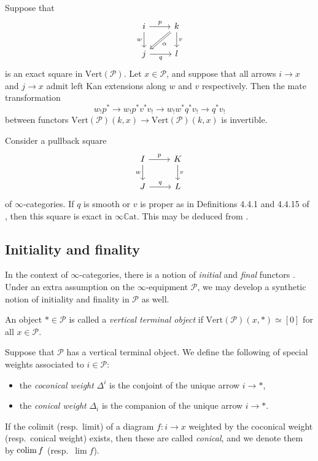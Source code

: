 \documentclass[a4paper, 11pt]{amsart}
\numberwithin{theorem}{section}
\theoremstyle{definition}
\def\colim{\qopname\relax m{colim}}
\renewcommand{\P}{\mathscr{P}}
\renewcommand{\Vert}{\mathrm{Vert}}
\newcommand{\CCAT}{\mathbb{C}\mathrm{at}}
\begin{document}
\begin{corollary}\label{cor.exact-square-mate}
	Suppose that
	\[
		\begin{tikzcd}
			i \arrow[r, "p"]\arrow[d,"w"'] &|[alias=f]| k \arrow[d, "v"] \\ 
			|[alias=t]|j \arrow[r, "q"'] & l 
			\arrow[from=f,to=t, Rightarrow, "\alpha"]
		\end{tikzcd}
	\]
	is an exact square in $\Vert(\P)$. Let $x\in \P$, and suppose 
	that all arrows $i \rightarrow x$ and $j \rightarrow x$ admit left Kan extensions 
	along $w$ and $v$ respectively. Then 
	the mate transformation 
	$$
	w_!p^* \rightarrow w_!p^*v^*v_! \rightarrow w_!w^*q^*v_! \rightarrow q^*v_!
	$$
	between functors $\Vert(\P)(k,x) \rightarrow \Vert(\P)(k,x)$
	is invertible.
\end{corollary}

\begin{example}\label{rem.proper-smooth}
	Consider a pullback square
	\[
		\begin{tikzcd}
			I \arrow[r, "p"]\arrow[d,"w"'] & K \arrow[d, "v"] \\ 
			J \arrow[r, "q"] & L
		\end{tikzcd}
	\]
	of $\infty$-categories. If $q$ is smooth or $v$ is proper as in Definitions 4.4.1 and 4.4.15 of \cite{Cisinski}, 
	then this square is exact in $\infty\CCAT$. This may be deduced from \cite[Proposition 6.4.3]{Cisinski}.
\end{example}


\subsection{Initiality and finality}\label{ssection.initial-final} In the context of $\infty$-categories, there is a notion 
of \textit{initial} and \textit{final} functors \cite[Section 4.1]{HTT}. Under an extra assumption 
on the $\infty$-equipment $\P$, we may develop a synthetic notion of initiality and finality in $\P$ as well.

\begin{definition}\label{def.pointed-equipment}
	An object $\ast \in \P$ is called a \textit{vertical terminal object} if 
	$\Vert(\P)(x,\ast) \simeq [0]$
	for all $x \in \P$.
\end{definition}

\begin{definition}\label{def.conical-colims}
	Suppose that $\P$ has a vertical terminal object. We define the following of special weights associated to $i \in \P$: 
	\begin{itemize}
		\item the \textit{coconical weight} $\Delta^i$ is the conjoint of the unique arrow $i \rightarrow \ast$,
		\item the \textit{conical weight} $\Delta_i$ is the companion of the unique arrow $i \rightarrow \ast$.
	\end{itemize} If the colimit (resp.\ limit) of a diagram $f : i \rightarrow x$ weighted by the coconical weight (resp.\ conical weight) exists, then 
	these are called \textit{conical}, and we denote them by $\colim f$ (resp.\ $\lim f$).
\end{definition}
\end{document}

